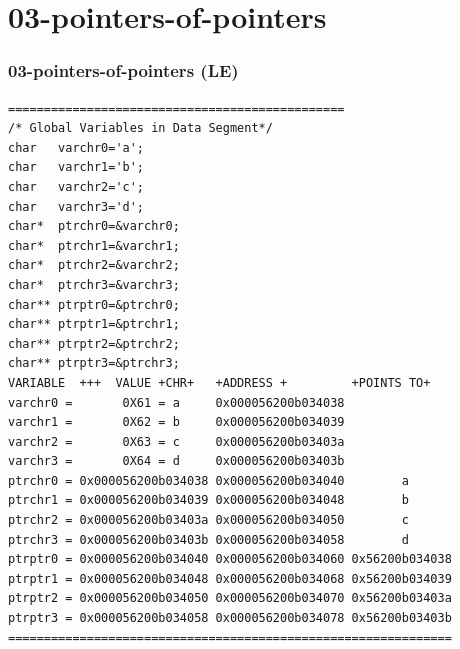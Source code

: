 \documentclass[xcolor=table, notheorems, hyperref={pdfpagelabels=false}]{beamer}
\begin{document}
\section{03-pointers-of-pointers}
\begin{frame}[fragile]
\frametitle{03-pointers-of-pointers (LE)}
\begin{lstlisting}[basicstyle=\ttfamily\tiny]  
===============================================
/* Global Variables in Data Segment*/
char   varchr0='a';
char   varchr1='b';
char   varchr2='c';
char   varchr3='d';
char*  ptrchr0=&varchr0;
char*  ptrchr1=&varchr1;
char*  ptrchr2=&varchr2;
char*  ptrchr3=&varchr3;
char** ptrptr0=&ptrchr0;
char** ptrptr1=&ptrchr1;
char** ptrptr2=&ptrchr2;
char** ptrptr3=&ptrchr3;
VARIABLE  +++  VALUE +CHR+   +ADDRESS +         +POINTS TO+ 
varchr0 =       0X61 = a     0x000056200b034038
varchr1 =       0X62 = b     0x000056200b034039
varchr2 =       0X63 = c     0x000056200b03403a
varchr3 =       0X64 = d     0x000056200b03403b
ptrchr0 = 0x000056200b034038 0x000056200b034040        a
ptrchr1 = 0x000056200b034039 0x000056200b034048        b
ptrchr2 = 0x000056200b03403a 0x000056200b034050        c
ptrchr3 = 0x000056200b03403b 0x000056200b034058        d
ptrptr0 = 0x000056200b034040 0x000056200b034060 0x56200b034038
ptrptr1 = 0x000056200b034048 0x000056200b034068 0x56200b034039
ptrptr2 = 0x000056200b034050 0x000056200b034070 0x56200b03403a
ptrptr3 = 0x000056200b034058 0x000056200b034078 0x56200b03403b
==============================================================
\end{lstlisting}

\end{frame}
\end{document}

